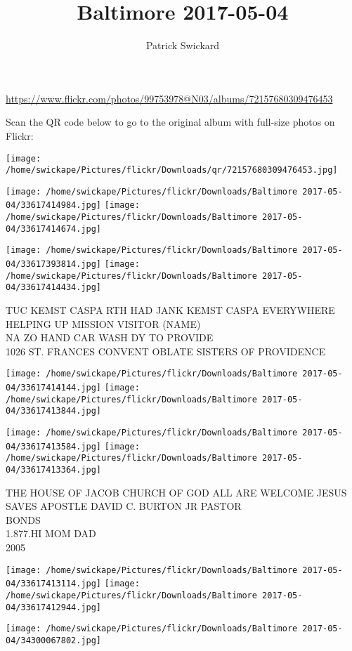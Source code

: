 \documentclass[10pt,letterpaper]{article}
\title{Baltimore 2017-05-04}
\author{Patrick Swickard}
\date{}
\begin{document}
\maketitle

\url{https://www.flickr.com/photos/99753978@N03/albums/72157680309476453}

Scan the QR code below to go to the original album with full-size photos on Flickr:

\texttt{[image: /home/swickape/Pictures/flickr/Downloads/qr/72157680309476453.jpg]}
\pagebreak

\texttt{[image: /home/swickape/Pictures/flickr/Downloads/Baltimore 2017-05-04/33617414984.jpg]}
\texttt{[image: /home/swickape/Pictures/flickr/Downloads/Baltimore 2017-05-04/33617414674.jpg]}

\texttt{[image: /home/swickape/Pictures/flickr/Downloads/Baltimore 2017-05-04/33617393814.jpg]}
\texttt{[image: /home/swickape/Pictures/flickr/Downloads/Baltimore 2017-05-04/33617414434.jpg]}

TUC KEMST CASPA RTH HAD JANK KEMST CASPA EVERYWHERE\\
HELPING UP MISSION VISITOR (NAME)\\
NA ZO HAND CAR WASH DY TO PROVIDE\\
1026 ST. FRANCES CONVENT OBLATE SISTERS OF PROVIDENCE
\pagebreak

\texttt{[image: /home/swickape/Pictures/flickr/Downloads/Baltimore 2017-05-04/33617414144.jpg]}
\texttt{[image: /home/swickape/Pictures/flickr/Downloads/Baltimore 2017-05-04/33617413844.jpg]}

\texttt{[image: /home/swickape/Pictures/flickr/Downloads/Baltimore 2017-05-04/33617413584.jpg]}
\texttt{[image: /home/swickape/Pictures/flickr/Downloads/Baltimore 2017-05-04/33617413364.jpg]}

THE HOUSE OF JACOB CHURCH OF GOD ALL ARE WELCOME JESUS SAVES APOSTLE DAVID C. BURTON JR PASTOR\\
BONDS\\
1.877.HI MOM DAD\\
2005
\pagebreak

\texttt{[image: /home/swickape/Pictures/flickr/Downloads/Baltimore 2017-05-04/33617413114.jpg]}
\texttt{[image: /home/swickape/Pictures/flickr/Downloads/Baltimore 2017-05-04/33617412944.jpg]}

\vspace{0.25in}
\texttt{[image: /home/swickape/Pictures/flickr/Downloads/Baltimore 2017-05-04/34300067802.jpg]}
\end{document}
